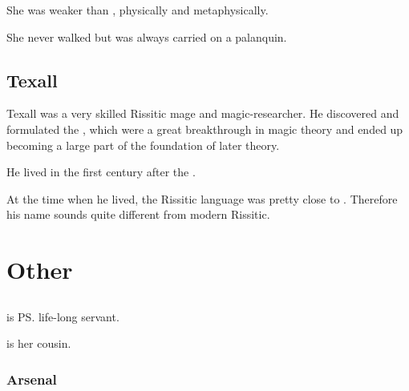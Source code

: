 She was weaker than \LocarPsyrex, physically and metaphysically. 

She never walked but was always carried on a palanquin. 















\section{Texall}
Texall was a very skilled Rissitic mage and magic-researcher. 
He discovered and formulated the , which were a great breakthrough in magic theory and ended up becoming a large part of the foundation of later  theory. 

He lived in the first century after the . 

At the time when he lived, the Rissitic language was pretty close to \Ortaican. 
Therefore his name sounds quite different from modern Rissitic. 























\chapter{Other}
\section{\Criseis}
\index{\Criseis}
\Criseis{} is \ps{\Ishnaruchaefir} life-long servant. 

 is her cousin. 









\subsection{Arsenal}





